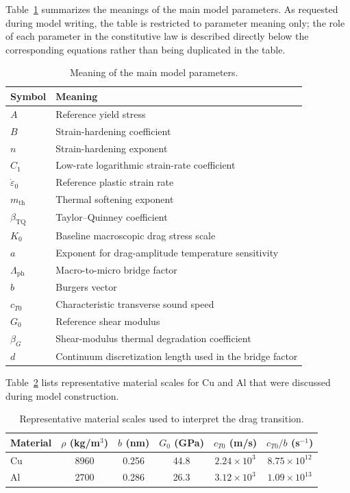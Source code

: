 Table~\ref{tab:model_parameters} summarizes the meanings of the main model parameters. As requested during model writing, the table is restricted to parameter meaning only; the role of each parameter in the constitutive law is described directly below the corresponding equations rather than being duplicated in the table.

\begin{table}[H]
\centering
\caption{Meaning of the main model parameters.}
\label{tab:model_parameters}
\begin{tabular}{ll}
\toprule
Symbol & Meaning \\
\midrule
$A$ & Reference yield stress \\
$B$ & Strain-hardening coefficient \\
$n$ & Strain-hardening exponent \\
$C_1$ & Low-rate logarithmic strain-rate coefficient \\
$\dot{\varepsilon}_0$ & Reference plastic strain rate \\
$m_{\mathrm{th}}$ & Thermal softening exponent \\
$\beta_{\mathrm{TQ}}$ & Taylor--Quinney coefficient \\
$K_0$ & Baseline macroscopic drag stress scale \\
$a$ & Exponent for drag-amplitude temperature sensitivity \\
$\Lambda_{\mathrm{ph}}$ & Macro-to-micro bridge factor \\
$b$ & Burgers vector \\
$c_{T0}$ & Characteristic transverse sound speed \\
$G_0$ & Reference shear modulus \\
$\beta_G$ & Shear-modulus thermal degradation coefficient \\
$d$ & Continuum discretization length used in the bridge factor \\
\bottomrule
\end{tabular}
\end{table}

Table~\ref{tab:material_scales} lists representative material scales for Cu and Al that were discussed during model construction.

\begin{table}[H]
\centering
\caption{Representative material scales used to interpret the drag transition.}
\label{tab:material_scales}
\begin{tabular}{lccccc}
\toprule
Material & $\rho$ (kg/m$^3$) & $b$ (nm) & $G_0$ (GPa) & $c_{T0}$ (m/s) & $c_{T0}/b$ (s$^{-1}$) \\
\midrule
Cu & 8960 & 0.256 & 44.8 & $2.24\times10^3$ & $8.75\times10^{12}$ \\
Al & 2700 & 0.286 & 26.3 & $3.12\times10^3$ & $1.09\times10^{13}$ \\
\bottomrule
\end{tabular}
\end{table}
